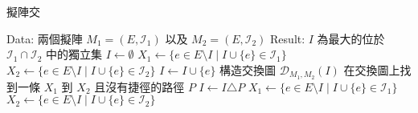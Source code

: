 擬陣交

\begin{algorithmic}
    \State Data: 兩個擬陣 $M_1 = (E, \mathcal{I}_1)$ 以及 $M_2 = (E, \mathcal{I}_2)$
    \State Result: $I$ 為最大的位於 $\mathcal{I}_1 \cap \mathcal{I}_2$ 中的獨立集
    \State $I \gets \emptyset$
    \State $X_1 \gets \{e \in E \setminus I \mid I \cup \{e\} \in \mathcal{I}_1\}$
    \State $X_2 \gets \{e \in E \setminus I \mid I \cup \{e\} \in \mathcal{I}_2\}$
    \State $I \gets I \cup \{e\}$
    \Else
    \State 構造交換圖 $\mathcal{D}_{M_1,M_2}(I)$
    \State 在交換圖上找到一條 $X_1$ 到 $X_2$ 且沒有捷徑的路徑 $P$
    \State $I \gets I \triangle P$
    \EndIf
    \State $X_1 \gets \{e \in E \setminus I \mid I \cup \{e\} \in \mathcal{I}_1\}$
    \State $X_2 \gets \{e \in E \setminus I \mid I \cup \{e\} \in \mathcal{I}_2\}$
    \EndWhile


\end{algorithmic}


